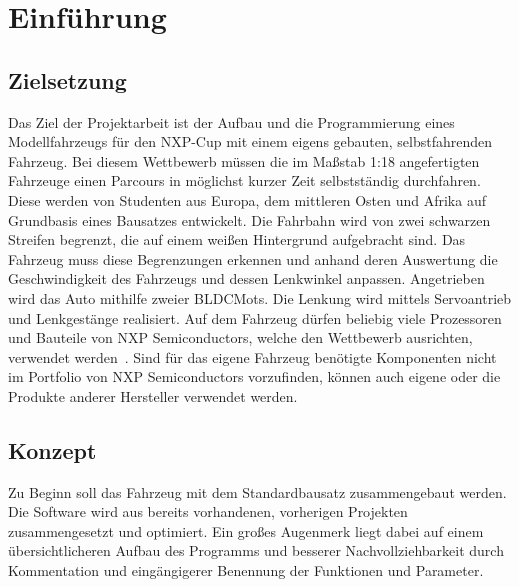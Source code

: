 

\rhead{\thepage} \chead{} 
\cfoot{}

\section{Einführung}\label{Sec1}

\subsection{Zielsetzung}\label{Sub1Sec1}

Das Ziel der Projektarbeit ist der Aufbau und die Programmierung eines Modellfahrzeugs für den \ac{NXP}-Cup mit einem eigens gebauten, selbstfahrenden Fahrzeug. Bei diesem Wettbewerb müssen die im Maßstab 1:18 angefertigten Fahrzeuge einen Parcours in möglichst kurzer Zeit selbstständig durchfahren. Diese werden von Studenten aus Europa, dem mittleren Osten und Afrika auf Grundbasis eines Bausatzes entwickelt. Die Fahrbahn wird von zwei schwarzen Streifen begrenzt, die auf einem weißen Hintergrund aufgebracht sind. Das Fahrzeug muss diese Begrenzungen erkennen und anhand deren Auswertung die Geschwindigkeit des Fahrzeugs und dessen Lenkwinkel anpassen. Angetrieben wird das Auto mithilfe zweier \acp{BLDCMot}. Die Lenkung wird mittels Servoantrieb und Lenkgestänge realisiert. Auf dem Fahrzeug dürfen beliebig viele Prozessoren und Bauteile von NXP Semiconductors, welche den Wettbewerb ausrichten, verwendet werden~\cite{MWil}. Sind für das eigene Fahrzeug benötigte Komponenten nicht im Portfolio von NXP Semiconductors vorzufinden, können auch eigene oder die Produkte anderer Hersteller verwendet werden. 

\subsection{Konzept}\label{Sub1Sec2}

Zu Beginn soll das Fahrzeug mit dem Standardbausatz zusammengebaut werden. Die Software wird aus bereits vorhandenen, vorherigen Projekten zusammengesetzt und optimiert. Ein großes Augenmerk liegt dabei auf einem übersichtlicheren Aufbau des Programms und besserer Nachvollziehbarkeit durch Kommentation und eingängigerer Benennung der Funktionen und Parameter.\vspace{11pt}

